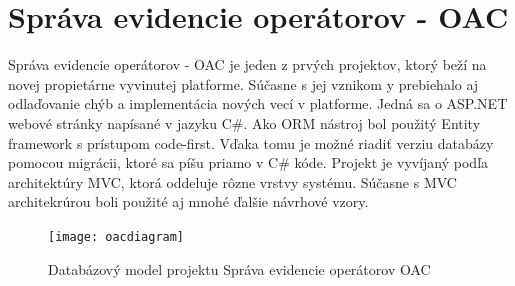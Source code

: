 \documentclass[11pt, oneside]{report}
\begin{document}
\section{Správa evidencie operátorov - OAC}
Správa evidencie operátorov - OAC  je jeden z prvých projektov, ktorý beží na novej propietárne vyvinutej platforme. Súčasne s jej vznikom y prebiehalo aj odlaďovanie chýb  a implementácia nových vecí v platforme. Jedná sa o ASP.NET webové stránky napísané v jazyku C\#. Ako ORM nástroj  bol použitý Entity framework s prístupom code-first. Vďaka tomu je možné riadiť verziu  databázy pomocou migrácii, ktoré sa píšu priamo v C\# kóde. Projekt je vyvíjaný podľa architektúry MVC, ktorá oddeluje rôzne vrstvy systému. Súčasne s MVC architekrúrou boli použité aj mnohé ďalšie návrhové vzory. 

\begin{figure}[H]
    \centering
    \texttt{[image: oacdiagram]}
    \caption{Databázový model projektu Správa evidencie operátorov OAC}
    \label{fig:propertycompare}
\end{figure}
\end{document}
